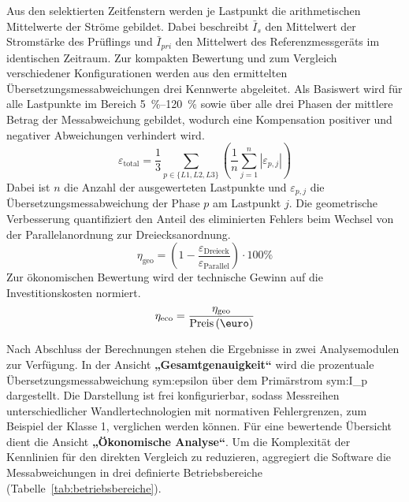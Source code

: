Aus den selektierten Zeitfenstern werden je Lastpunkt die arithmetischen Mittelwerte der Ströme gebildet. Dabei beschreibt $\bar{I}_{s}$ den Mittelwert der Stromstärke des Prüflings und $\bar{I}_{pri}$ den Mittelwert des Referenzmessgeräts im identischen Zeitraum. Zur kompakten Bewertung und zum Vergleich verschiedener Konfigurationen werden aus den ermittelten Übersetzungsmessabweichungen drei Kennwerte abgeleitet. Als Basiswert wird für alle Lastpunkte im Bereich \SIrange{5}{120}{\percent} sowie über alle drei Phasen der mittlere Betrag der Messabweichung gebildet, wodurch eine Kompensation positiver und negativer Abweichungen verhindert wird.
\begin{equation}
    \label{eq:etotal}
    \varepsilon_{\text{total}}
    =
    \frac{1}{3}
    \sum_{p \in \{L1,L2,L3\}}
    \left(
    \frac{1}{n}
    \sum_{j=1}^{n}
    \left|\varepsilon_{p,j}\right|
    \right)
\end{equation}
Dabei ist $n$ die Anzahl der ausgewerteten Lastpunkte und $\varepsilon_{p,j}$ die Übersetzungsmessabweichung der Phase $p$ am Lastpunkt $j$. Die geometrische Verbesserung quantifiziert den Anteil des eliminierten Fehlers beim Wechsel von der Parallelanordnung zur Dreiecksanordnung.
\begin{equation}
    \label{eq:eta_geo}
    \eta_{\text{geo}}
    =
    \left(
    1 - \frac{\varepsilon_{\text{Dreieck}}}{\varepsilon_{\text{Parallel}}}
    \right)\cdot 100\%
\end{equation}
Zur ökonomischen Bewertung wird der technische Gewinn auf die Investitionskosten normiert.
\begin{equation}
    \label{eq:eta_eco}
    \eta_{\text{eco}}
    =
    \frac{\eta_{\text{geo}}}{\text{Preis}\,(\text{\euro})}
\end{equation}

Nach Abschluss der Berechnungen stehen die Ergebnisse in zwei Analysemodulen zur Verfügung. In der Ansicht \textbf{„Gesamtgenauigkeit“} wird die prozentuale Übersetzungsmessabweichung \gls{sym:epsilon} über dem Primärstrom \gls{sym:I_p} dargestellt. Die Darstellung ist frei konfigurierbar, sodass Messreihen unterschiedlicher Wandlertechnologien mit normativen Fehlergrenzen, zum Beispiel der Klasse \num{1}, verglichen werden können. Für eine bewertende Übersicht dient die Ansicht \textbf{„Ökonomische Analyse“}. Um die Komplexität der Kennlinien für den direkten Vergleich zu reduzieren, aggregiert die Software die Messabweichungen in drei definierte Betriebsbereiche (Tabelle~\ref{tab:betriebsbereiche}).

